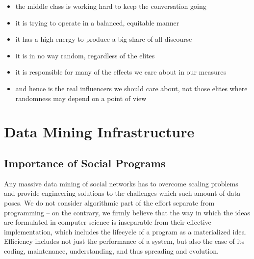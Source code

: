 \documentclass[10pt,oneside]{memoir}
\begin{document}
\begin{itemize}


\item the middle class is working hard to keep the conversation going

\item it is trying to operate in a balanced, equitable manner

\item it has a high energy to produce a big share of all discourse

\item it is in no way random, regardless of the elites

\item it is responsible for many of the effects we care about in our measures

\item and hence is the real influencers we should care about, not those elites where randomness may depend on a point of view
\end{itemize}

\pagebreak \chapter{Data Mining Infrastructure}
\label{datamininginfrastructure}

\section{Importance of Social Programs}
\label{importanceofsocialprograms}

Any massive data mining of social networks has to overcome scaling problems and provide engineering solutions to the challenges which such amount of data poses.  We do not consider algorithmic part of the effort separate from programming -- on the contrary, we firmly believe that the way in which the ideas are formulated in computer science is inseparable from their effective implementation, which includes the lifecycle of a program as a materialized idea.  Efficiency includes not just the performance of a system, but also the ease of its coding, maintenance, understanding, and thus spreading and evolution.
\end{document}
